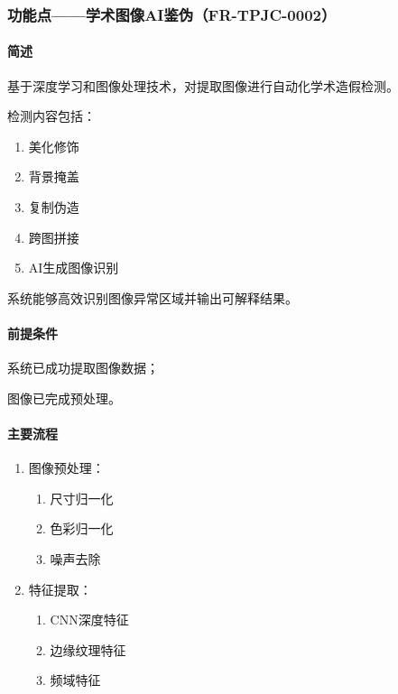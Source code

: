{\color{black}
\subsubsection{功能点——学术图像AI鉴伪（FR-TPJC-0002）}

\paragraph*{简述}

基于深度学习和图像处理技术，对提取图像进行自动化学术造假检测。

检测内容包括：

\begin{enumerate}
    \item 美化修饰
    \item 背景掩盖
    \item 复制伪造
    \item 跨图拼接
    \item AI生成图像识别
\end{enumerate}

系统能够高效识别图像异常区域并输出可解释结果。

\paragraph*{前提条件}

系统已成功提取图像数据；

图像已完成预处理。

\paragraph*{主要流程}

\begin{enumerate}
    \item 图像预处理：
    \begin{enumerate}
        \item 尺寸归一化
        \item 色彩归一化
        \item 噪声去除
    \end{enumerate}
    
    \item 特征提取：
    \begin{enumerate}
        \item CNN深度特征
        \item 边缘纹理特征
        \item 频域特征
    \end{enumerate}
    

\end{enumerate}}

